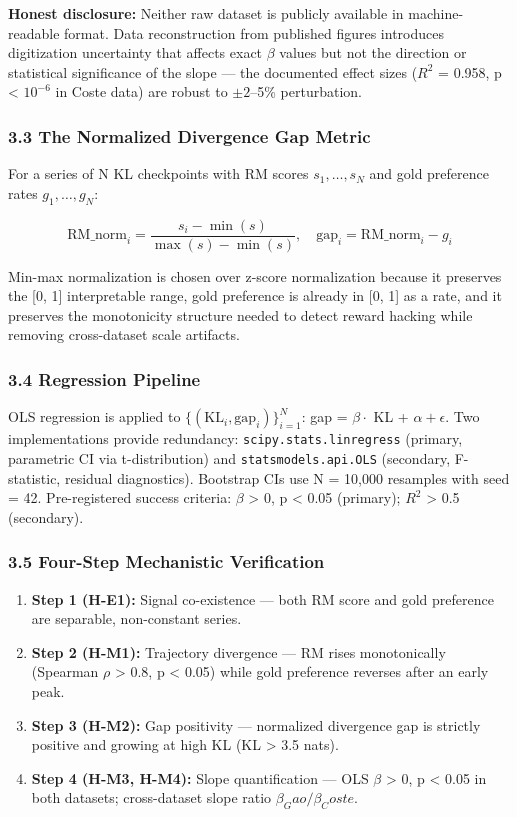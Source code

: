 \textbf{Honest disclosure:} Neither raw dataset is publicly available in machine-readable format. Data reconstruction from published figures introduces digitization uncertainty that affects exact $\beta$ values but not the direction or statistical significance of the slope --- the documented effect sizes ($R^2$ = 0.958, p < $10^{-6}$ in Coste data) are robust to $\pm 2$--5\% perturbation.

\subsubsection{3.3 The Normalized Divergence Gap Metric}

For a series of N KL checkpoints with RM scores $s_1, \ldots, s_N$ and gold preference rates $g_1, \ldots, g_N$:

$$\text{RM\_norm}_i = \frac{s_i - \min(s)}{\max(s) - \min(s)}, \quad \text{gap}_i = \text{RM\_norm}_i - g_i$$

Min-max normalization is chosen over z-score normalization because it preserves the [0, 1] interpretable range, gold preference is already in [0, 1] as a rate, and it preserves the monotonicity structure needed to detect reward hacking while removing cross-dataset scale artifacts.

\subsubsection{3.4 Regression Pipeline}

OLS regression is applied to $\{(\text{KL}_i, \text{gap}_i)\}_{i=1}^{N}$: gap = $\beta \cdot$ KL + $\alpha + \epsilon$. Two implementations provide redundancy: \texttt{scipy.stats.linregress} (primary, parametric CI via t-distribution) and \texttt{statsmodels.api.OLS} (secondary, F-statistic, residual diagnostics). Bootstrap CIs use N = 10,000 resamples with seed = 42. Pre-registered success criteria: $\beta$ > 0, p < 0.05 (primary); $R^2$ > 0.5 (secondary).

\subsubsection{3.5 Four-Step Mechanistic Verification}

\begin{enumerate}
\item \textbf{Step 1 (H-E1):} Signal co-existence --- both RM score and gold preference are separable, non-constant series.
\item \textbf{Step 2 (H-M1):} Trajectory divergence --- RM rises monotonically (Spearman $\rho$ > 0.8, p < 0.05) while gold preference reverses after an early peak.
\item \textbf{Step 3 (H-M2):} Gap positivity --- normalized divergence gap is strictly positive and growing at high KL (KL > 3.5 nats).
\item \textbf{Step 4 (H-M3, H-M4):} Slope quantification --- OLS $\beta$ > 0, p < 0.05 in both datasets; cross-dataset slope ratio $\beta _Gao / \beta _Coste$.
\end{enumerate}

